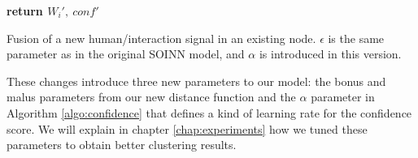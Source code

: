 \begin{algorithm}[htp]
    \textbf{return $W_i', ~conf'$}
    \caption{Fusion of a new human/interaction signal in an existing node. $\epsilon$ is the same parameter as in the original SOINN model, and $\alpha$ is introduced in this version.}
    \label{algo:confidence}
\end{algorithm}

These changes introduce three new parameters to our model: the bonus and malus parameters from our new distance function and the $\alpha$ parameter in Algorithm \ref{algo:confidence} that defines a kind of learning rate for the confidence score. We will explain in chapter \ref{chap:experiments} how we tuned these parameters to obtain better clustering results.